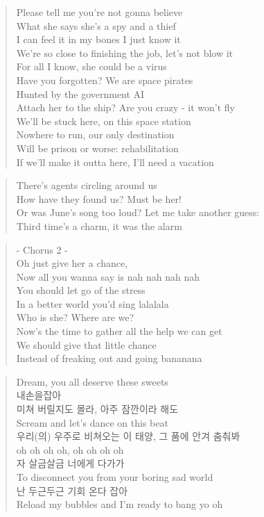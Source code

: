 \begin{verse}
Please tell me you're not gonna believe\\
What she says she's a spy and a thief\\
I can feel it in my bones I just know it\\
We're so close to finishing the job, let's not blow it\\
For all I know, she could be a virus\\
Have you forgotten? We are space pirates\\
Hunted by the government AI\\
Attach her to the ship? Are you crazy - it won't fly \\
We'll be stuck here, on this space station \\
Nowhere to run, our only destination\\
Will be prison or worse: rehabilitation \\
If we'll make it outta here, I'll need a vacation
\end{verse}

\clearpage
{}


\begin{verse}
There's agents circling around us\\
How have they found us? Must be her!\\
Or was June's song too loud? Let me take another guess: \\
Third time's a charm, it was the alarm
\end{verse}

\begin{verse}
- Chorus 2 -\\
Oh just give her a chance, \\
Now all you wanna say is nah nah nah nah\\
You should let go of the stress\\
In a better world you'd sing lalalala\\
Who is she? Where are we?\\
Now's the time to gather all the help we can get \\
We should give that little chance \\
Instead of freaking out and going bananana \\
\end{verse}

\begin{verse}
Dream, you all deserve these sweets\\
내\ks 손을\ks 잡아\\
미쳐 버릴지도 몰라, 아주 잠깐이라 해도\\
Scream and let's dance on this beat\\
우리(의) 우주로 비쳐오는 이 태양, 그 품에 안겨 춤춰봐\\
oh oh oh oh, oh oh oh oh\\
자 살금살금 너에게 다가가\\
To disconnect you from your boring sad world\\
난 두근두근 기회 온다 잡아\\
Reload my bubbles and I'm ready to bang yo oh\\
\end{verse}

